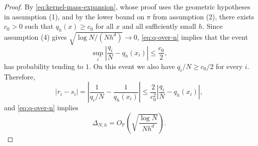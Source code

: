 \documentclass[10pt,a4paper]{amsart}
\begin{document}
\begin{proof}
By \eqref{eq:kernel-mass-expansion}, whose proof uses the geometric hypotheses in assumption \textup{(1)}, and by the lower bound on $\pi$ from assumption \textup{(2)}, there exists $c_0>0$ such that $q_h(x)\ge c_0$ for all $x$ and all sufficiently small $h$. Since assumption \textup{(4)} gives $\sqrt{\log N/(N h^d)}\to 0$, \eqref{eq:q-over-n} implies that the event
\begin{equation}
\sup_i\left|\frac{q_i}{N}-q_h(x_i)\right|\le \frac{c_0}{2},
\end{equation}
has probability tending to $1$. On this event we also have $q_i/N\ge c_0/2$ for every $i$. Therefore,
\begin{equation}
\left|r_i-s_i\right|
=
\left|
\frac{1}{q_i/N}-\frac{1}{q_h(x_i)}
\right|
\le
\frac{2}{c_0^2}
\left|
\frac{q_i}{N}-q_h(x_i)
\right|,
\end{equation}
and \eqref{eq:q-over-n} implies
\begin{equation}
\label{eq:reciprocal-rate}
\Delta_{N,h}
=
O_{\mathbb P}\!\left(\sqrt{\frac{\log N}{N h^d}}\right).
\end{equation}


\end{proof}
\end{document}
